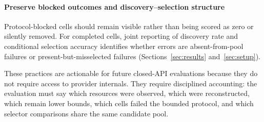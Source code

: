 \paragraph{Preserve blocked outcomes and discovery--selection structure}
Protocol-blocked cells should remain visible rather than being scored as zero or silently removed.
For completed cells, joint reporting of discovery rate and conditional selection accuracy identifies
whether errors are absent-from-pool failures or present-but-misselected failures
(Sections~\ref{sec:results} and~\ref{sec:setup}).

These practices are actionable for future closed-API evaluations because they do not require access
to provider internals. They require disciplined accounting: the evaluation must say which resources
were observed, which were reconstructed, which remain lower bounds, which cells failed the bounded
protocol, and which selector comparisons share the same candidate pool.
